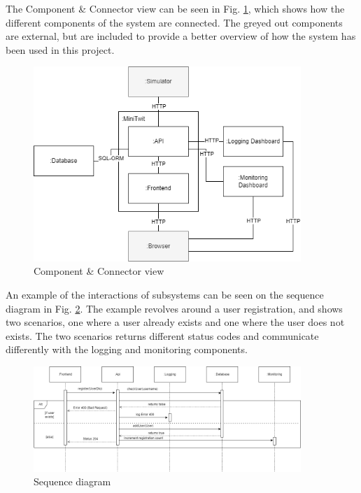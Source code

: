\documentclass[10pt]{article}
\begin{document}
The Component \& Connector view can be seen in Fig. \ref{fig:cc}, which shows how the different components of the system are connected. The greyed out components are external, but are included to provide a better overview of how the system has been used in this project.

\begin{figure} [H]
  \centering
  \includegraphics[width=0.9\textwidth]{images/devops-cc.png}
  \caption{Component \& Connector view}
  \label{fig:cc}
\end{figure}

An example of the interactions of subsystems can be seen on the sequence diagram in Fig. \ref{fig:sequence}. The example revolves around a user registration, and shows two scenarios, one where a user already exists and one where the user does not exists. The two scenarios returns different status codes and communicate differently with the logging and monitoring components.

\begin{figure} [H]
  \centering
  \includegraphics[width=0.9\textwidth]{images/devops-sequence.png}
  \caption{Sequence diagram}
  \label{fig:sequence}
\end{figure}
\end{document}
